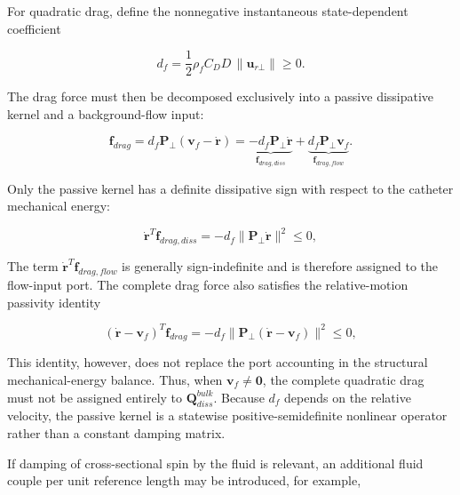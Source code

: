 For quadratic drag, define the nonnegative instantaneous state-dependent coefficient

\begin{equation}
\label{eq:rod-1-62}
d_{f} = \frac{1}{2}\rho_{f}C_{D}D\, \parallel \mathbf{u}_{r\bot} \parallel \geq 0.
\end{equation}

The drag force must then be decomposed exclusively into a passive dissipative kernel and a background-flow input:

\begin{equation}
\label{eq:rod-1-63}
\boxed{\mathbf{f}_{drag} = d_{f}\mathbf{P}_{\bot}\left( \mathbf{v}_{f} - \dot{\mathbf{r}} \right) = \underset{\mathbf{f}_{drag,diss}}{\underbrace{- d_{f}\mathbf{P}_{\bot}\dot{\mathbf{r}}}} + \underset{\mathbf{f}_{drag,flow}}{\underbrace{d_{f}\mathbf{P}_{\bot}\mathbf{v}_{f}}}.}
\end{equation}

Only the passive kernel has a definite dissipative sign with respect to the catheter mechanical energy:

\begin{equation}
\label{eq:rod-1-64}
{\dot{\mathbf{r}}}^{T}\mathbf{f}_{drag,diss} = - d_{f} \parallel \mathbf{P}_{\bot}\dot{\mathbf{r}} \parallel^{2} \leq 0,
\end{equation}

The term \({\dot{\mathbf{r}}}^{T}\mathbf{f}_{drag,flow}\) is generally sign-indefinite and is therefore assigned to the flow-input port. The complete drag force also satisfies the relative-motion passivity identity

\begin{equation}
\label{eq:rod-1-65}
\left( \dot{\mathbf{r}} - \mathbf{v}_{f} \right)^{T}\mathbf{f}_{drag} = - d_{f} \parallel \mathbf{P}_{\bot}\left( \dot{\mathbf{r}} - \mathbf{v}_{f} \right) \parallel^{2} \leq 0,
\end{equation}

This identity, however, does not replace the port accounting in the structural mechanical-energy balance. Thus, when \(\mathbf{v}_{f} \neq \mathbf{0}\), the complete quadratic drag must not be assigned entirely to \(\mathbf{Q}_{diss}^{bulk}\). Because \(d_{f}\) depends on the relative velocity, the passive kernel is a statewise positive-semidefinite nonlinear operator rather than a constant damping matrix.

If damping of cross-sectional spin by the fluid is relevant, an additional fluid couple per unit reference length may be introduced, for example,

